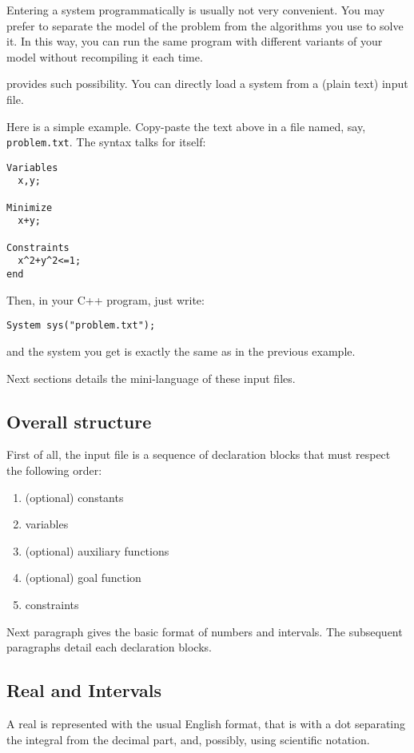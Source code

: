 Entering a system programmatically is usually not very convenient.
You may prefer to separate the model of the problem from the algorithms
you use to solve it. In this way, you can run the same program with different
variants of your model without recompiling it each time.

\ibex provides such possibility. You can directly load a system from a (plain text) input file.

Here is a simple example. Copy-paste the text above in a file named, say, {\tt problem.txt}. 
The syntax talks for itself:

\begin{verbatim}
Variables
  x,y;

Minimize
  x+y;

Constraints
  x^2+y^2<=1;
end
\end{verbatim}

Then, in your C++ program, just write:

\begin{lstlisting}
System sys("problem.txt");
\end{lstlisting}

and the system you get is exactly the same as in the previous example.

Next sections details the mini-language of these input files. 

\subsection{Overall structure}
First of all, the input file is a sequence of declaration blocks that must respect the following order:
\begin{enumerate}
\item (optional) constants
\item variables
\item (optional) auxiliary functions
\item (optional) goal function
\item constraints
\end{enumerate}

Next paragraph gives the basic format of numbers and intervals.
The subsequent paragraphs detail each declaration blocks.

\subsection{Real and Intervals}
A real is represented with the usual English format, that is
with a dot separating the integral from the decimal part,
and, possibly, using scientific notation.

